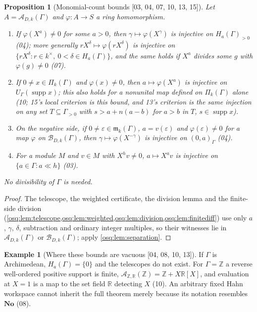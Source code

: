 \documentclass[11pt,letterpaper]{article}
\numberwithin{equation}{section}
\newtheorem{proposition}[proposition]{Proposition}
\theoremstyle{definition}
\newtheorem{example}[example]{Example}
\theoremstyle{remark}
\theoremstyle{plain}
\newcommand{\No}{\mathbf{No}}
\newcommand{\Z}{\mathbb Z}
\newcommand{\R}{\mathbb R}
\newcommand{\A}{\mathcal A}          %
\newcommand{\B}{\mathcal B}          %
\newcommand{\mm}{\mathfrak m}        %
\newcommand{\supp}{\operatorname{supp}}
\newcommand{\src}[1]{\textup{\textsf{[#1]}}}
\begin{document}
\begin{proposition}[Monomial-count bounds \src{03, 04, 07, 10, 13, 15}]\label{osq:prop:monomialbounds}
Let $A=\A_{D,k}(\Gamma)$ and $\varphi:A\to S$ a ring homomorphism.
\begin{enumerate}
\item If $\varphi(X^a)\ne0$ for some $a>0$, then $\gamma\mapsto\varphi(X^\gamma)$ is injective
on $H_a(\Gamma)_{>0}$ (04); more generally $r X^\delta\mapsto\varphi(rX^\delta)$ is injective on
$\{rX^\delta:r\in k^\times,\ 0<\delta\in H_a(\Gamma)\}$, and the same holds if $X^a$ divides
some $g$ with $\varphi(g)\ne0$ (07).
\item If $0\ne x\in\Pi_k(\Gamma)$ and $\varphi(x)\ne0$, then $a\mapsto\varphi(X^a)$ is injective on
$U_\Gamma(\supp x)$; this also holds for a nonunital map defined on $\Pi_k(\Gamma)$ alone (10; 15's
local criterion is this bound, and 13's criterion is the same injection on any set $T\subseteq\Gamma_{>0}$ with
$s>a+n(a-b)$ for $a>b$ in $T$, $s\in\supp x$).
\item On the negative side, if $0\ne\varepsilon\in\mm_k(\Gamma)$, $a=v(\varepsilon)$ and
$\varphi(\varepsilon)\ne0$ for a map $\varphi$ on $\B_{D,k}(\Gamma)$, then
$\gamma\mapsto\varphi(X^{-\gamma})$ is injective on $(0,a)_\Gamma$ (04).
\item For a module $M$ and $v\in M$ with $X^hv\ne0$, $a\mapsto X^av$ is injective on
$\{a\in\Gamma: a\ll h\}$ (03).
\end{enumerate}
No divisibility of $\Gamma$ is needed.
\end{proposition}
\begin{proof}
The telescope, the weighted certificate, the division lemma and the finite-side division
(\cref{osq:lem:telescope,osq:lem:weighted,osq:lem:division,osq:lem:finitediff}) use only
$a$, $\gamma$, $\delta$, subtraction and ordinary integer multiples, so their witnesses lie in
$\A_{D,k}(\Gamma)$ or $\B_{D,k}(\Gamma)$; apply \cref{osq:lem:separation}.
\end{proof}

\begin{example}[Where these bounds are vacuous \src{04, 08, 10, 13}]\label{osq:ex:archimedean}
If $\Gamma$ is Archimedean, $H_a(\Gamma)=\{0\}$ and the telescopes do not exist. For
$\Gamma=\Z$ a reverse well-ordered positive support is finite, $\A_{\Z,\R}(\Z)=\Z+X\R[X]$,
and evaluation at $X=1$ is a map to the set field $\R$ detecting $X$ (10). An arbitrary fixed
Hahn workspace cannot inherit the full theorem merely because its notation resembles $\No$
(08).
\end{example}
\end{document}
